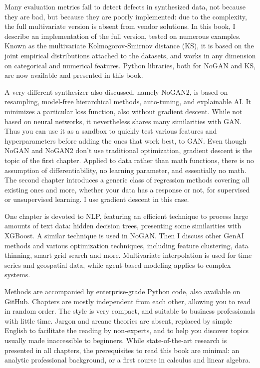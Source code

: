 \documentclass[oneside,10pt]{book}
\begin{document}
Many evaluation metrics fail to detect defects in synthesized data, not because they are bad, but because 
 they are poorly implemented: due to the complexity, the full multivariate version is absent from vendor solutions. In this book, I describe an implementation
 of the full version, tested on numerous examples. Known as the multivariate Kolmogorov-Smirnov distance (KS), it is based on the joint empirical distributions attached to the datasets, and works in any dimension on categorical and numerical features. Python libraries, both for NoGAN and KS, are now available and presented in this book.

A very different synthesizer also discussed,  namely NoGAN2, is based on resampling, model-free hierarchical methods, auto-tuning, and explainable AI. It minimizes a particular loss function, also without gradient descent. While not based on neural networks, it nevertheless shares many similarities with GAN. Thus you can use it as a sandbox to quickly test various features and hyperparameters before adding the ones that work best, to GAN. 
Even though NoGAN and NoGAN2 don't use traditional optimization, gradient descent is the topic of the first chapter. Applied to data rather than math functions, there is no assumption of differentiability, no learning parameter, and essentially no math. The second chapter introduces a generic class of regression methods covering all existing ones and more, whether your data has a response or not, for supervised or unsupervised learning. I use gradient descent in this case.

One chapter is devoted to NLP, featuring an efficient technique to process large amounts of text data: hidden decision trees, presenting some similarities with XGBoost. A similar
 technique is used in NoGAN. Then I discuss other GenAI methods and various optimization techniques, including feature clustering, data thinning, smart grid search and more. Multivariate interpolation is used for time series and geospatial data, while agent-based modeling applies to complex systems. 


Methods are accompanied by enterprise-grade Python code, also available on GitHub. Chapters are mostly independent from each other, allowing you to read in random order. 
The style is very compact, and suitable to business professionals with little time. Jargon and arcane theories are absent, replaced by simple English to facilitate the reading by non-experts, and to help you discover topics usually made inaccessible to beginners.  While state-of-the-art research is presented in all chapters, the prerequisites to read this book are minimal: an analytic professional background, or a first course in calculus and linear algebra. 
\end{document}
